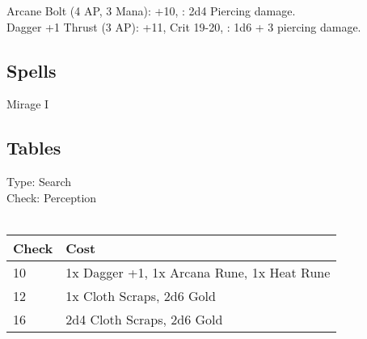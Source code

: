 Arcane Bolt (4 AP, 3 Mana): +10, : 2d4 Piercing damage.\\

Dagger +1 Thrust (3 AP): +11, Crit 19-20, : 1d6 + 3 piercing damage.\\

\subsection{Spells}
Mirage I\\

\subsection{Tables}
Type: Search\\
Check: Perception\\
\\
\begin{minipage}{0.8\textwidth}
	\begin{tabular}{|l | l|}
		\hline
		Check & Cost\\
		\hline
		10 & 1x Dagger +1, 1x Arcana Rune, 1x Heat Rune\\
		12 & 1x Cloth Scraps, 2d6 Gold\\
		16 & 2d4 Cloth Scraps, 2d6 Gold\\
		\hline
	\end{tabular}
\end{minipage}
\pagebreak